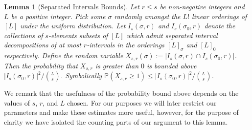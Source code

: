 \documentclass[11pt,a4paper]{amsart}
\newtheorem{lemma}[theorem]{Lemma}
\theoremstyle{definition}
\theoremstyle{remark}
\newcommand{\Fpr}{\mathbb{P}}
\begin{document}
\begin{lemma}[Separated Intervals Bounds]\label{lem:sepintbounds}
Let $r \leq s$ be non-negative integers and $L$ be a positive integer.  Pick some $\sigma$ randomly amongst the $L!$ linear orderings of $[L]$ under the uniform distribution.  Let $I_{s}(\sigma,r)$ and $I_{s}(\sigma_{0},r)$ denote the collections of $s$-elements subsets of $[L]$ which admit separated interval decompositions of at most $r$-intervals in the orderings $[L]_{\sigma}$ and $[L]_{0}$ respectively.  Define the random variable $X_{s,r}(\sigma) := |I_{s}(\sigma,r) \cap I_{s}(\sigma_{0},r)|$.  Then the probability that $X_{s,r}$ is greater than $0$ is bounded above $|I_{s}(\sigma_{0},r)|^{2}/\binom{L}{s}$.  Symbolically $\Fpr\left(X_{s,r} \geq 1 \right) \leq |I_{s}(\sigma_{0},r)|^{2}/\binom{L}{s}$.  
\end{lemma}

We remark that the usefulness of the probability bound above depends on the values of $s$, $r$, and $L$ chosen.  For our purposes we will later restrict our parameters and make these estimates more useful, however, for the purpose of clarity we have isolated the counting parts of our argument to this lemma.  
\end{document}
